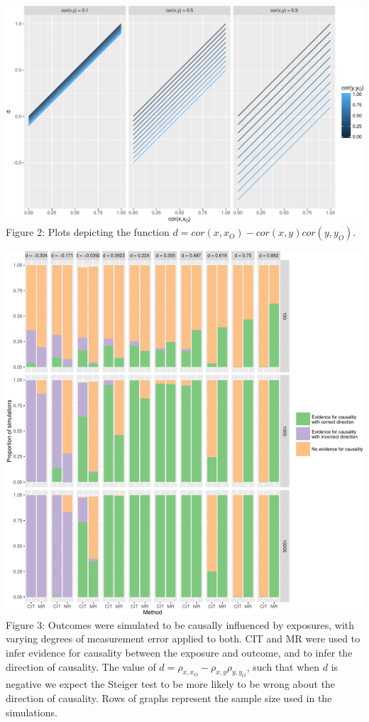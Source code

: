 \documentclass[]{article}
\begin{document}
\includegraphics{manuscript_files/figure-latex/d_relationship_figure-1.pdf}\\
Figure 2: Plots depicting the function
\(d = cor(x, x_O) - cor(x,y)cor(y, y_O)\).

\newpage

\includegraphics{manuscript_files/figure-latex/cit_mr_comparison_figure-1.pdf}\\
Figure 3: Outcomes were simulated to be causally influenced by
exposures, with varying degrees of measurement error applied to both.
CIT and MR were used to infer evidence for causality between the
exposure and outcome, and to infer the direction of causality. The value
of \(d = \rho_{x, x_O} - \rho_{x,y}\rho_{y,y_O}\), such that when \(d\)
is negative we expect the Steiger test to be more likely to be wrong
about the direction of causality. Rows of graphs represent the sample
size used in the simulations.
\end{document}
